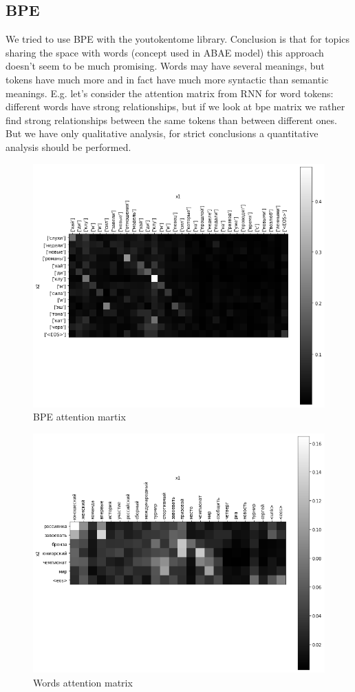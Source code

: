 \documentclass{article}
\begin{document}
\subsection{BPE}
We tried to use BPE with the youtokentome \cite{youtokentome} library. Conclusion is that for topics sharing the space with words (concept used in ABAE model) this approach doesn't seem to be much promising. Words may have several meanings, but tokens have much more and in fact have much more syntactic than semantic meanings. E.g. let's consider the attention matrix from RNN for word tokens: different words have strong relationships, but if we look at bpe matrix we rather find strong relationships between the same tokens than between different ones. But we have only qualitative analysis, for strict conclusions a quantitative analysis should be performed.
\begin{figure}[H]
    \centering
    \includegraphics[width=1\linewidth]{attn_bpe.png}
    \caption{BPE attention martix}
    \label{fig:circle}
\end{figure}
\begin{figure}[H]
    \centering
    \includegraphics[width=1\linewidth]{attnnn.png}
    \caption{Words attention matrix}
    \label{fig:circle}
\end{figure}
\end{document}
